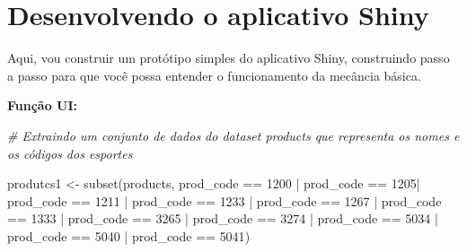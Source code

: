 \documentclass[
]{book}
\newenvironment{Shaded}{\begin{snugshade}}{\end{snugshade}}
\newcommand{\CommentTok}[1]{\textcolor[rgb]{0.56,0.35,0.01}{\textit{#1}}}
\newcommand{\DecValTok}[1]{\textcolor[rgb]{0.00,0.00,0.81}{#1}}
\newcommand{\FunctionTok}[1]{\textcolor[rgb]{0.00,0.00,0.00}{#1}}
\newcommand{\NormalTok}[1]{#1}
\newcommand{\OtherTok}[1]{\textcolor[rgb]{0.56,0.35,0.01}{#1}}
\newcommand{\SpecialCharTok}[1]{\textcolor[rgb]{0.00,0.00,0.00}{#1}}
\begin{document}
\hypertarget{desenvolvendo-o-aplicativo-shiny}{%
\section{\texorpdfstring{\textbf{Desenvolvendo o aplicativo Shiny}}{Desenvolvendo o aplicativo Shiny}}\label{desenvolvendo-o-aplicativo-shiny}}

Aqui, vou construir um protótipo simples do aplicativo Shiny, construindo passo a passo para que você possa entender o funcionamento da mecância básica.

\textbf{Função UI:}

\begin{Shaded}
\begin{Highlighting}[]
\CommentTok{\# Extraindo um conjunto de dados do dataset products que representa os nomes e os códigos dos esportes}

\NormalTok{produtcs1 }\OtherTok{\textless{}{-}} \FunctionTok{subset}\NormalTok{(products, prod\_code }\SpecialCharTok{==} \DecValTok{1200} \SpecialCharTok{|}\NormalTok{ prod\_code }\SpecialCharTok{==} \DecValTok{1205}\SpecialCharTok{|}\NormalTok{ prod\_code }\SpecialCharTok{==} \DecValTok{1211} 
                    \SpecialCharTok{|}\NormalTok{ prod\_code }\SpecialCharTok{==} \DecValTok{1233} \SpecialCharTok{|}\NormalTok{ prod\_code }\SpecialCharTok{==} \DecValTok{1267} \SpecialCharTok{|}\NormalTok{ prod\_code }\SpecialCharTok{==} \DecValTok{1333} \SpecialCharTok{|}\NormalTok{ prod\_code }\SpecialCharTok{==} \DecValTok{3265} 
                    \SpecialCharTok{|}\NormalTok{ prod\_code }\SpecialCharTok{==} \DecValTok{3274} \SpecialCharTok{|}\NormalTok{ prod\_code }\SpecialCharTok{==} \DecValTok{5034} \SpecialCharTok{|}\NormalTok{ prod\_code }\SpecialCharTok{==} \DecValTok{5040} \SpecialCharTok{|}\NormalTok{ prod\_code }\SpecialCharTok{==} \DecValTok{5041}\NormalTok{)}


\end{Highlighting}
\end{Shaded}
\end{document}
